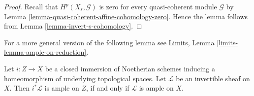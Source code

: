 \begin{proof}
Recall that $H^p(X_s, \mathcal{G})$ is zero for every quasi-coherent
module $\mathcal{G}$ by
Lemma \ref{lemma-quasi-coherent-affine-cohomology-zero}.
Hence the lemma follows from
Lemma \ref{lemma-invert-s-cohomology}.
\end{proof}

\noindent
For a more general version of the following lemma see
Limits, Lemma \ref{limits-lemma-ample-on-reduction}.

\begin{lemma}
\label{lemma-ample-on-reduction}
Let $i : Z \to X$ be a closed immersion of Noetherian schemes
inducing a homeomorphism of underlying topological spaces.
Let $\mathcal{L}$ be an invertible sheaf on $X$.
Then $i^*\mathcal{L}$ is ample on $Z$, if and only if
$\mathcal{L}$ is ample on $X$.
\end{lemma}

